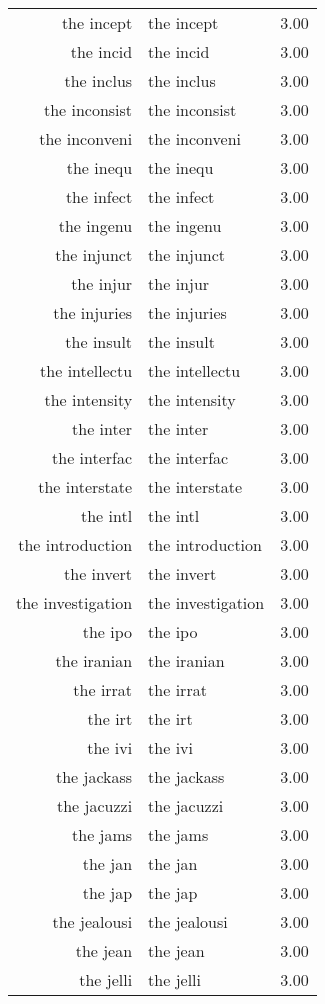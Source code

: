 \begin{table}[ht]
\begin{tabular}{rlr}
  the incept & the incept & 3.00 \\ 
  the incid & the incid & 3.00 \\ 
  the inclus & the inclus & 3.00 \\ 
  the inconsist & the inconsist & 3.00 \\ 
  the inconveni & the inconveni & 3.00 \\ 
  the inequ & the inequ & 3.00 \\ 
  the infect & the infect & 3.00 \\ 
  the ingenu & the ingenu & 3.00 \\ 
  the injunct & the injunct & 3.00 \\ 
  the injur & the injur & 3.00 \\ 
  the injuries & the injuries & 3.00 \\ 
  the insult & the insult & 3.00 \\ 
  the intellectu & the intellectu & 3.00 \\ 
  the intensity & the intensity & 3.00 \\ 
  the inter & the inter & 3.00 \\ 
  the interfac & the interfac & 3.00 \\ 
  the interstate & the interstate & 3.00 \\ 
  the intl & the intl & 3.00 \\ 
  the introduction & the introduction & 3.00 \\ 
  the invert & the invert & 3.00 \\ 
  the investigation & the investigation & 3.00 \\ 
  the ipo & the ipo & 3.00 \\ 
  the iranian & the iranian & 3.00 \\ 
  the irrat & the irrat & 3.00 \\ 
  the irt & the irt & 3.00 \\ 
  the ivi & the ivi & 3.00 \\ 
  the jackass & the jackass & 3.00 \\ 
  the jacuzzi & the jacuzzi & 3.00 \\ 
  the jams & the jams & 3.00 \\ 
  the jan & the jan & 3.00 \\ 
  the jap & the jap & 3.00 \\ 
  the jealousi & the jealousi & 3.00 \\ 
  the jean & the jean & 3.00 \\ 
  the jelli & the jelli & 3.00 \\ 

\end{tabular}
\end{table}
